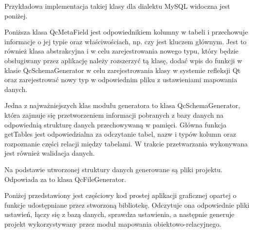 \documentclass[12pt]{report}
\let\oldaddcontentsline\addcontentsline
\newcommand{\lstinputcplusplus}[2][]{{%
  \renewcommand{\lstlistingname}{C++ Code}%
  \renewcommand{\addcontentsline}[3]{\oldaddcontentsline{loc}{##2}{##3}}%
}}
\begin{document}
\begin{framed}
\lstinputcplusplus[caption={QcDatabase}]{additional/databasedescriptor.h}
\end{framed}

Przykładowa implementacja takiej klasy dla dialektu MySQL widoczna jest poniżej.

\begin{framed}
\lstinputcplusplus[caption={QcDatabase}]{additional/mysqldescriptor.cpp}
\end{framed}

Poniższa klasa QcMetaField jest odpowiednikiem kolumny w tabeli i przechowuje informacje o jej typie oraz właściwościach, np. czy jest kluczem głównym. Jest to również klasa abstrakcyjna i w celu zarejestrowania nowego typu, który będzie obsługiwany przez aplikację należy rozszerzyć tą klasę, dodać wpis do funkcji w klasie QcSchemaGenerator w celu zarejestrowania klasy w systemie refleksji Qt oraz zarejestrować nowy typ w odpowiednim pliku z ustawieniami mapowania danych.

\begin{framed}
\lstinputcplusplus[caption={QcDatabase}]{additional/qcmetafield.h}
\end{framed}

Jedna z najważniejszych klas modułu generatora to klasa QcSchemaGenerator, która zajmuje się przetworzeniem informacji pobranych z bazy danych na odpowiednią strukturę danych przechowywaną w pamięci. Główna funkcja getTables jest odpowiedzialna za odczytanie tabel, nazw i typów kolumn oraz rozpoznanie części relacji między tabelami. W trakcie przetwarzania wykonywana jest również walidacja danych.

\begin{framed}
\lstinputcplusplus[caption={QcDatabase}]{additional/qcschemagenerator.cpp}
\end{framed}

Na podstawie utworzonej struktury danych generowane są pliki projektu. Odpowiada za to klasa QcFileGenerator.

\begin{framed}
\lstinputcplusplus[caption={QcDatabase}]{additional/qcfilegenerator.h}
\end{framed}

Poniżej przedstawiony jest częściowy kod prostej aplikacji graficznej opartej o funkcje udostępniane przez stworzoną bibliotekę. Odczytuje ona odpowiednie pliki ustawień, łączy się z bazą danych, sprawdza ustawienia, a następnie generuje projekt wykorzystywany przez moduł mapowania obiektowo-relacyjnego.
\end{document}
